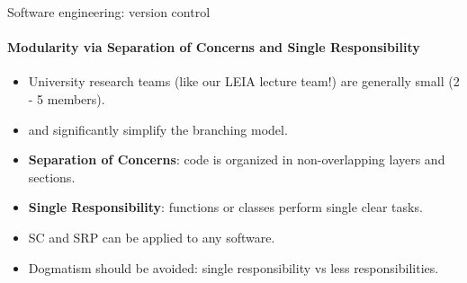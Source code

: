 \begin{frame}{Software engineering: version control}
    \framesubtitle{Modularity via Separation of Concerns and Single Responsibility}

	\vfill
	\begin{itemize}

            \item University research teams (like our LEIA lecture team!) are generally small (2 - 5 members).
            \item \href{https://en.wikipedia.org/wiki/Separation_of_concerns}{} and \href{https://en.wikipedia.org/wiki/Single-responsibility_principle}{} significantly simplify the branching model. 

            \item \textbf{Separation of Concerns}: code is organized in non-overlapping layers and sections. 

            \item \textbf{Single Responsibility}: functions or classes perform single clear tasks.

            \item SC and SRP can be applied to any software.
            \item Dogmatism should be avoided: single responsibility vs less responsibilities. 
        \end{itemize}


\end{frame}


